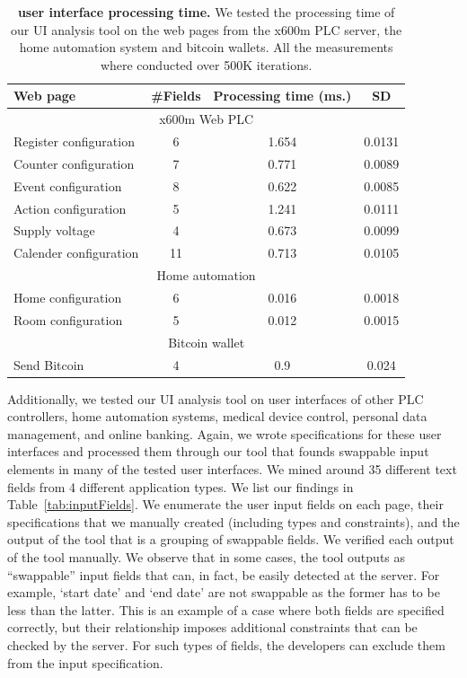 \begin{table}[t]
\centering
\small
\caption[\tool user interface processing time]{\textbf{\tool user interface processing time.} We tested the processing time of our UI analysis tool on the web pages from the x600m PLC server, the home automation system and bitcoin wallets. All the measurements where conducted over 500K iterations.}
\begin{tabular}{lccc}
\textbf{Web page} & \textbf{\#Fields} &\textbf{Processing time (ms.)} & \textbf{SD}\\ \toprule
\multicolumn{4}{c}{x600m Web PLC} \\ \midrule
Register configuration & 6 & 1.654 & 0.0131\\ 
Counter configuration & 7 & 0.771 & 0.0089\\ 
Event configuration & 8 & 0.622 & 0.0085\\ 
Action configuration & 5 & 1.241 & 0.0111\\ 
Supply voltage & 4 & 0.673 & 0.0099\\ 
Calender configuration & 11 & 0.713 & 0.0105\\ \midrule
\multicolumn{4}{c}{Home automation} \\ \midrule
Home configuration & 6 & 0.016 & 0.0018\\ 
Room configuration & 5 & 0.012 & 0.0015\\ 
\hline
\multicolumn{4}{c}{Bitcoin wallet} \\ \midrule
Send Bitcoin & 4 & 0.9 & 0.024\\ 
\bottomrule
\end{tabular}


\label{tab:frameworkPerformance}
\end{table}


Additionally, we tested our UI analysis tool on user interfaces of other PLC controllers, home automation systems, medical device control, personal data management, and online banking. Again, we wrote specifications for these user interfaces and processed them through our tool that founds swappable input elements in many of the tested user interfaces. We mined around 35 different text fields from 4 different application types. We list our findings in Table~\ref{tab:inputFields}. We enumerate the user input fields on each page, their specifications that we manually created (including types and constraints), and the output of the tool that is a grouping of swappable fields. We verified each output of the tool manually. We observe that in some cases, the tool outputs as ``swappable'' input fields that can, in fact, be easily detected at the server. For example, `start date' and `end date' are not swappable as the former has to be less than the latter. This is an example of a case where both fields are specified correctly, but their relationship imposes additional constraints that can be checked by the server. For such types of fields, the developers can exclude them from the input specification.

